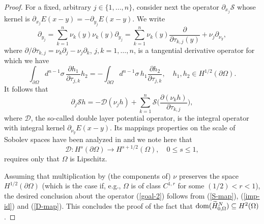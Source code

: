 \documentclass[reqno,10pt, centertags]{amsart}
\newcommand{\wti}{\widetilde}
\newcommand{\Om}{\Omega}
\newcommand{\dom}{\text{\rm{dom}}}
\numberwithin{equation}{section}
\theoremstyle{definition}
\begin{document}
\begin{proof}
For a fixed, arbitrary $j\in\{1,...,n\}$, consider next the operator
$\partial_{x_j}{\mathcal S}$ whose kernel is
$\partial_{x_j}E(x-y)=-\partial_{y_j}E(x-y)$. We write
\begin{equation}
\partial_{y_j}=\sum_{k=1}^n \nu_k(y)\nu_k(y)\partial_{y_j}
=\sum_{k=1}^n
\nu_k(y)\frac{\partial}{\partial\tau_{k,j}(y)}+\nu_j\partial_{\nu_y},
\end{equation}
where $\partial/\partial\tau_{k,j}=\nu_k\partial_j-\nu_j\partial_k$,
$j,k=1,\dots,n$, is a tangential derivative operator for which we have
\begin{equation}
\int_{\partial\Omega} d^{n-1}\sigma \, \frac{\partial
h_1}{\partial\tau_{j,k}}h_2
=-\int_{\partial\Omega}  d^{n-1}\sigma \, h_1\frac{\partial
h_2}{\partial\tau_{j,k}}, \quad h_1, h_2\in
H^{1/2}(\partial\Omega).
\end{equation}
It follows that
\begin{equation}\label{imp-id}
\partial_j{\mathcal S}h=-{\mathcal D}(\nu_j h)
+ \sum_{k=1}^n
{\mathcal S}\bigg(\frac{\partial(\nu_k h)}{\partial\tau_{k,j}}\bigg),
\end{equation}
where ${\mathcal D}$, the so-called double layer potential operator,
is the integral operator with integral kernel $\partial_{\nu_y}E(x-y)$.
Its mappings properties on the scale of Sobolev spaces have been analyzed
in \cite{MT00} and we note here that
\begin{equation}\label{D-map}
{\mathcal D}\colon H^{s}(\partial\Omega)\rightarrow
H^{s+1/2}(\Omega),\quad 0\leq s\leq 1,
\end{equation}
requires only that $\Omega$ is Lipschitz.

Assuming that multiplication by (the components of) $\nu$ preserves
the space $H^{1/2}(\partial\Omega)$ (which is the case if, e.g.,
$\Om$ is of class $C^{1,r}$ for some $(1/2)<r< 1$), the desired
conclusion about the operator (\ref{goal-2}) follows from (\ref{S-map}),
(\ref{imp-id}) and (\ref{D-map}). This concludes the proof of the fact that
$\dom(\wti H_{0,\Om}^N)\subseteq H^{2}(\Omega)$.


\end{proof}
\end{document}
